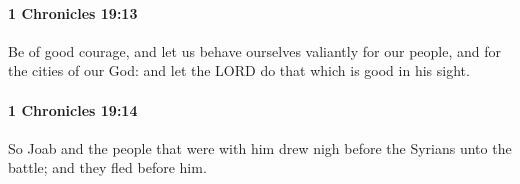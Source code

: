 		\paragraph{1 Chronicles 19:13} %
			\label{1CHRONICLES-19-13}

			Be of good courage, and let us behave ourselves valiantly for our people, and for the cities of our God: and let the LORD do that which is good in his sight.


		\paragraph{1 Chronicles 19:14} %
			\label{1CHRONICLES-19-14}

			So Joab and the people that were with him drew nigh before the Syrians unto the battle; and they fled before him.


